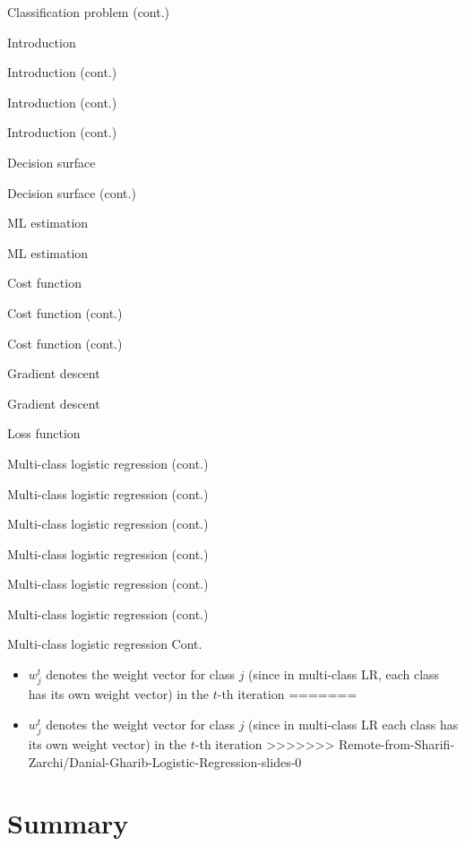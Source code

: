 \documentclass[serif, aspectratio=169]{beamer}
\begin{document}
\begin{frame}{Classification problem (cont.)}
\begin{itemize}
\begin{frame}{Introduction}
\begin{itemize}
\begin{frame}{Introduction (cont.)}
\begin{frame}{Introduction (cont.)}
\begin{frame}{Introduction (cont.)}
\begin{frame}{Decision surface}
\begin{itemize}
\begin{frame}{Decision surface (cont.)}
\begin{frame}{ML estimation}
\begin{frame}{ML estimation}
\begin{itemize}
\begin{frame}{Cost function}
\begin{frame}{Cost function (cont.)}
\begin{itemize}
\begin{itemize}
\begin{frame}{Cost function (cont.)}
\begin{frame}{Gradient descent}
\begin{frame}{Gradient descent}
\begin{frame}{Loss function}
\begin{frame}{Multi-class logistic regression (cont.)}
\begin{frame}{Multi-class logistic regression (cont.)}
\begin{frame}{Multi-class logistic regression (cont.)}
\begin{frame}{Multi-class logistic regression (cont.)}
\begin{frame}{Multi-class logistic regression (cont.)}
\begin{frame}{Multi-class logistic regression (cont.)}
\begin{frame}{Multi-class logistic regression Cont.}
    \begin{itemize}
<<<<<<< HEAD
        \item $w_j^t$ denotes the weight vector for class $j$ (since in multi-class LR, each class has its own weight vector) in the $t$-th iteration
=======
        \item $w_j^t$ denotes the weight vector for class $j$ (since in multi-class LR each class has its own weight vector) in the $t$-th iteration
>>>>>>> Remote-from-Sharifi-Zarchi/Danial-Gharib-Logistic-Regression-slides-0
    \end{itemize}
\end{frame}


\section{Summary}


\end{frame}
\end{frame}
\end{frame}
\end{frame}
\end{frame}
\end{frame}
\end{frame}
\end{frame}
\end{frame}
\end{frame}
\end{itemize}
\end{itemize}
\end{frame}
\end{frame}
\end{itemize}
\end{frame}
\end{frame}
\end{frame}
\end{itemize}
\end{frame}
\end{frame}
\end{frame}
\end{frame}
\end{itemize}
\end{frame}
\end{itemize}
\end{frame}
\end{document}

